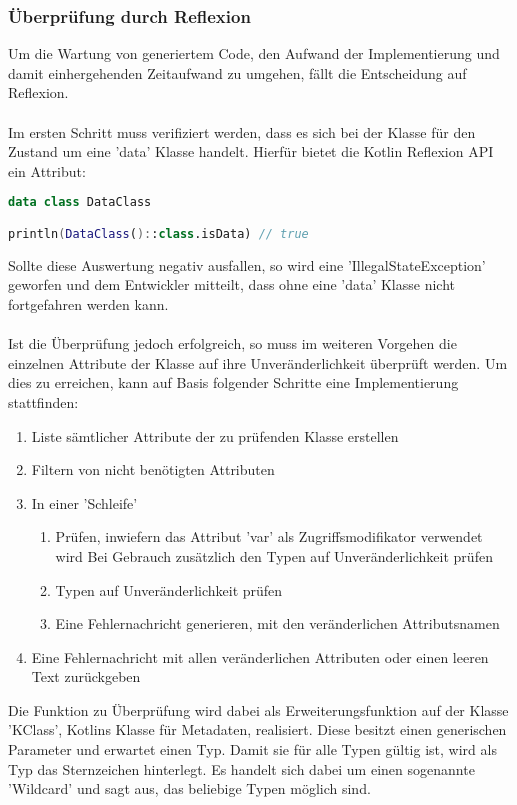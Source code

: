 \subsubsection{Überprüfung durch Reflexion}
Um die Wartung von generiertem Code, den Aufwand der Implementierung und damit einhergehenden Zeitaufwand zu umgehen, fällt die Entscheidung auf Reflexion. 
\\\\
Im ersten Schritt muss verifiziert werden, dass es sich bei der Klasse für den Zustand um eine 'data' Klasse handelt. Hierfür bietet die Kotlin Reflexion API ein Attribut:
\begin{lstlisting}[caption={Kotlin 'isData' Attribut}, label={lst:data-class}, language=Kotlin]
data class DataClass

println(DataClass()::class.isData) // true
\end{lstlisting}
\bigskip
Sollte diese Auswertung negativ ausfallen, so wird eine 'IllegalStateException' geworfen und dem Entwickler mitteilt, dass ohne eine 'data' Klasse nicht fortgefahren werden kann.
\\\\ 
Ist die Überprüfung jedoch erfolgreich, so muss im weiteren Vorgehen die einzelnen Attribute der Klasse auf ihre Unveränderlichkeit überprüft werden. Um dies zu erreichen, kann auf Basis folgender Schritte eine Implementierung stattfinden:
\begin{enumerate}[label*=\arabic*.]
	\item Liste sämtlicher Attribute der zu prüfenden Klasse erstellen
	\item Filtern von nicht benötigten Attributen
	\item In einer 'Schleife' 
	\begin{enumerate}[label*=\arabic*.]
		\item Prüfen, inwiefern das Attribut 'var' als Zugriffsmodifikator verwendet wird
			\subitem Bei Gebrauch zusätzlich den Typen auf Unveränderlichkeit prüfen
		\item Typen auf Unveränderlichkeit prüfen
		\item Eine Fehlernachricht generieren, mit den veränderlichen Attributsnamen
	\end{enumerate}
	\item Eine Fehlernachricht mit allen veränderlichen Attributen oder einen leeren Text zurückgeben
\end{enumerate}
Die Funktion zu Überprüfung wird dabei als Erweiterungsfunktion auf der Klasse 'KClass', Kotlins Klasse für Metadaten, realisiert. Diese besitzt einen generischen Parameter und erwartet einen Typ. Damit sie für alle Typen gültig ist, wird als Typ das Sternzeichen hinterlegt. Es handelt sich dabei um einen sogenannte 'Wildcard' und sagt aus, das beliebige Typen möglich sind.
